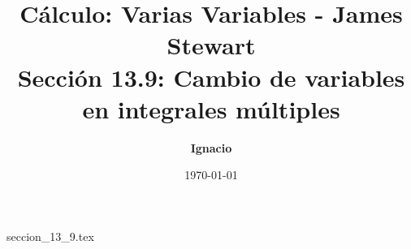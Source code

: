 \documentclass[11pt,spanish,oneside]{report}
\title{\textbf{Cálculo: Varias Variables - James Stewart} \\ \Large Sección 13.9: Cambio de variables en integrales múltiples}
\author{\textbf{Ignacio}}
\date{\today}
\begin{document}
\maketitle

{seccion_13_9.tex}
\end{document}
